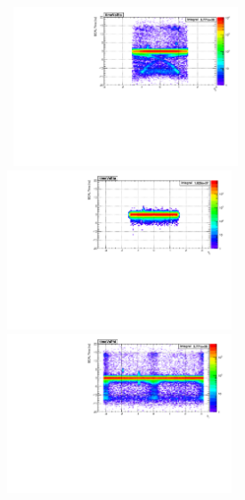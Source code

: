 \paragraph*{}\mbox{}\\
\begin{minipage}{\linewidth} 
\begin{center}
\centering
\mbox{
\includegraphics[height=0.50\textwidth, width=0.5\textwidth]{THESISPLOTS/SinglePhotonDataSet-TimeVsEtaEB.pdf}
\includegraphics[height=0.50\textwidth, width=0.5\textwidth]
{THESISPLOTS/ZCandidates_TimeVsEta.pdf}}
\mbox{
\includegraphics[height=0.50\textwidth, width=0.5\textwidth]{THESISPLOTS/SinglePhotonDataSet-TimeVsPhiEB.pdf}
}
\end{center}
\end{minipage}
